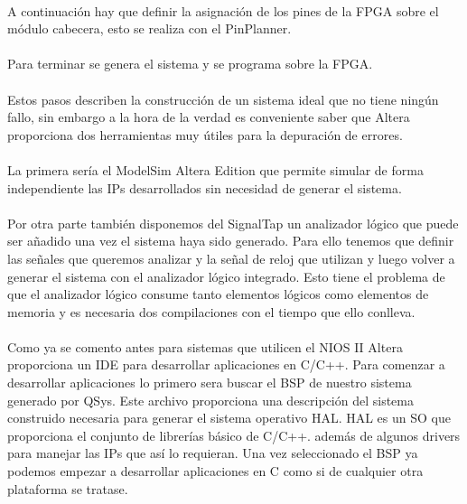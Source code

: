 \documentclass[a4paper,12pt,titlepage,final]{book}
\begin{document}
\paragraph{}
A continuación hay que definir la asignación de los pines de la FPGA sobre el módulo cabecera, esto se realiza con el PinPlanner.

\paragraph{}
Para terminar se genera el sistema y se programa sobre la FPGA.

\paragraph{}
Estos pasos describen la construcción de un sistema ideal que no tiene ningún fallo, sin embargo a la hora de la verdad es conveniente saber que Altera proporciona dos herramientas muy útiles para la depuración de errores. 

\paragraph{}
La primera sería el ModelSim Altera Edition que permite simular de forma independiente las IPs desarrollados sin necesidad de generar el sistema.

\paragraph{}
Por otra parte también disponemos del SignalTap un analizador lógico que puede ser añadido una vez el sistema haya sido generado. Para ello tenemos que definir las señales que queremos analizar y la señal de reloj que utilizan y luego volver a generar el sistema con el analizador lógico integrado. Esto tiene el problema de que el analizador lógico consume tanto elementos lógicos como elementos de memoria y es necesaria dos compilaciones con el tiempo que ello conlleva.

\paragraph{}
Como ya se comento antes para sistemas que utilicen el NIOS II Altera proporciona un IDE para desarrollar aplicaciones en C/C++. Para comenzar a desarrollar aplicaciones lo primero sera buscar el BSP de nuestro sistema generado por QSys. Este archivo proporciona una descripción del sistema construido necesaria para generar el sistema operativo HAL. HAL es un SO que proporciona el conjunto de librerías básico de C/C++. además de algunos drivers para manejar las IPs que así lo requieran. Una vez seleccionado el BSP ya podemos empezar a desarrollar aplicaciones en C como si de cualquier otra plataforma se tratase.
\end{document}
